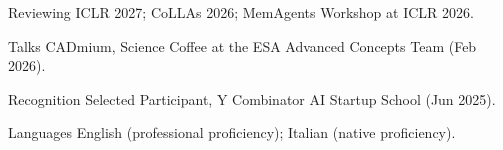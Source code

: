 

\begin{cvskills}

  \cvskill
    {Reviewing}
    {ICLR 2027; CoLLAs 2026; MemAgents Workshop at ICLR 2026.}

  \cvskill
    {Talks}
    {CADmium, Science Coffee at the ESA Advanced Concepts Team (Feb 2026).}

  \cvskill
    {Recognition}
    {Selected Participant, Y Combinator AI Startup School (Jun 2025).}

  \cvskill
    {Languages}
    {English (professional proficiency); Italian (native proficiency).}

\end{cvskills}
